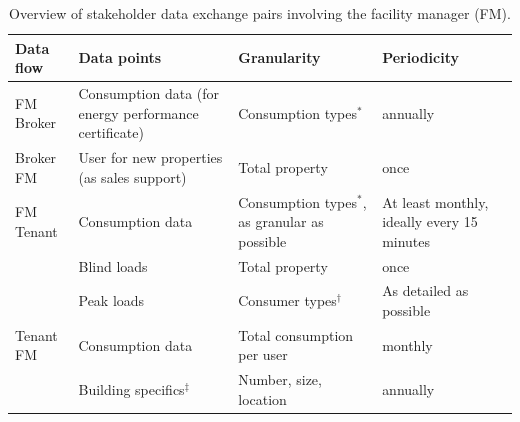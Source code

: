\begingroup{}
\begin{table}
\caption{Overview of stakeholder data exchange pairs involving the facility manager (FM).}
\label{tbl:facroom} 
\begin{tabular}{p{2.6cm} p{5cm} p{4cm} p{2.5cm}}
\textbf{Data flow} & \textbf{Data points} & \textbf{Granularity} & \textbf{Periodicity} \\
\hline

FM \textrightarrow{} Broker 
& Consumption data (for energy performance certificate) 
& Consumption types$^*$ 
& annually \\

Broker \textrightarrow{} FM 
& User for new properties (as sales support) 
& Total property 
& once \\
\hline

FM \textrightarrow{} Tenant
& Consumption data 
& Consumption types$^*$, as granular as possible 
& At least monthly, ideally every 15 minutes \\

& Blind loads
& Total property 
& once \\

& Peak loads 
& Consumer types$^\dagger$
& As detailed as possible\\

Tenant \textrightarrow{} FM 
& Consumption data
& Total consumption per user 
& monthly \\

& Building specifics$^\ddagger$
& Number, size, location 
& annually \\
\hline
\end{tabular}
\smallskip
{}
\end{table}

